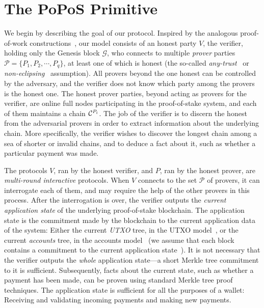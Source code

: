 \section{The PoPoS Primitive}

We begin by describing the goal of our protocol.
Inspired by the analogous proof-of-work constructions~\cite{nipopows},
our model consists of an honest party $V$,
the verifier, holding only the Genesis block $\mathcal{G}$, who connects to multiple
\emph{prover} parties $\mathcal{P} = \{P_1, P_2, \cdots, P_q\}$, at least one of which is honest
(the so-called \emph{any-trust}~\cite{arbitrum} or \emph{non-eclipsing}~\cite{eclipse,eclipse-ethereum}
assumption). All provers beyond the one honest can be controlled by the adversary,
and the verifier does not know which party among the provers is the honest one.
The honest prover parties, beyond acting as provers for the verifier, are online full nodes participating
in the proof-of-stake system, and each of them maintains a chain $\mathcal{C}^{P_i}$.
The job of the verifier is to discern the honest from the adversarial provers in order to extract
information about the underlying chain. More specifically, the verifier wishes to
discover the longest chain among a sea of shorter or invalid chains, and to deduce
a fact about it, such as whether a particular payment was made.

The protocols $V$, ran by the honest verifier, and $P$, ran by the honest prover, are
\emph{multi-round interactive} protocols. When $V$ connects to the set $\mathcal{P}$ of provers,
it can interrogate each of them, and may require the help of the other provers in this process.
After the interrogation is over, the verifier outputs the \emph{current application state} of
the underlying proof-of-stake blockchain. The application state is the commitment made by
the blockchain to the current application data of the system: Either the current \emph{UTXO}
tree, in the UTXO model~\cite{sok}, or the current \emph{accounts} tree, in the accounts
model~\cite{buterin} (we assume that each block contains a commitment to the current
application state~\cite{utreexo}). It is not necessary that the verifier outputs the
\emph{whole} application state---a short Merkle tree commitment to it is sufficient.
Subsequently, facts about the current state, such as whether a payment has been made,
can be proven using standard Merkle tree proof techniques. The application state is
sufficient for all the purposes of a wallet: Receiving and validating incoming payments
and making new payments.

